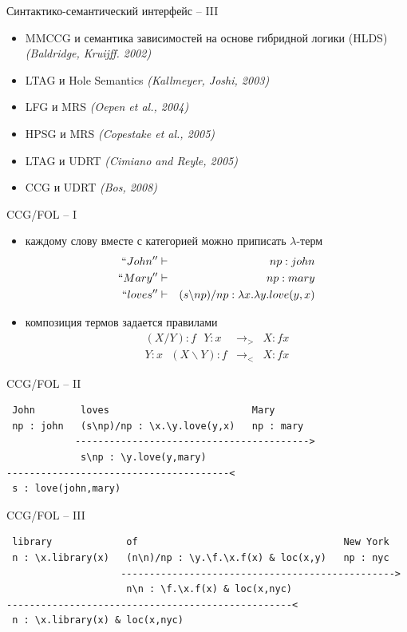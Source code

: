 \documentclass{beamer}
\begin{document}
\begin{frame}{Синтактико-семантический интерфейс -- III}
\begin{itemize}
    \item MMCCG и семантика зависимостей на основе гибридной логики (HLDS) \textit{(Baldridge, Kruijff. 2002)}
    \item LTAG и Hole Semantics \textit{(Kallmeyer, Joshi, 2003)}
    \item LFG и MRS \textit{(Oepen et al., 2004)}
    \item HPSG и MRS \textit{(Copestake et al., 2005)}
    \item LTAG и UDRT \textit{(Cimiano and Reyle, 2005)}
    \item CCG и UDRT \textit{(Bos, 2008)}
\end{itemize}
\end{frame}    	

\begin{frame}{CCG/FOL -- I}
  \begin{itemize}
    \item каждому слову вместе с категорией можно приписать $\lambda$-терм
      \begin{eqnarray*}
        ``John'' &\vdash& np : john \\
        ``Mary'' &\vdash& np : mary \\
        ``loves'' &\vdash& (s \backslash np) / np : \lambda x.\lambda y.love(y,x)
      \end{eqnarray*}
    \item композиция термов задается правилами
      \begin{eqnarray*}
        (X / Y) : f~~~Y : x &\rightarrow_{>}& X : fx \\
        Y : x~~~(X \backslash Y) : f &\rightarrow_{<}& X : fx
      \end{eqnarray*}
  \end{itemize}
\end{frame} 

\begin{frame}[fragile]{CCG/FOL -- II}
\begin{verbatim}
 John        loves                         Mary
 np : john   (s\np)/np : \x.\y.love(y,x)   np : mary
            ----------------------------------------->
             s\np : \y.love(y,mary)
---------------------------------------<
 s : love(john,mary)
\end{verbatim}
\end{frame} 

\begin{frame}[fragile]{CCG/FOL -- III}
\begin{footnotesize}
\begin{verbatim}
 library             of                                    New York
 n : \x.library(x)   (n\n)/np : \y.\f.\x.f(x) & loc(x,y)   np : nyc
                    ------------------------------------------------>
                     n\n : \f.\x.f(x) & loc(x,nyc)
--------------------------------------------------<
 n : \x.library(x) & loc(x,nyc)                     
\end{verbatim}
\end{footnotesize}
\end{frame} 
\end{document}

